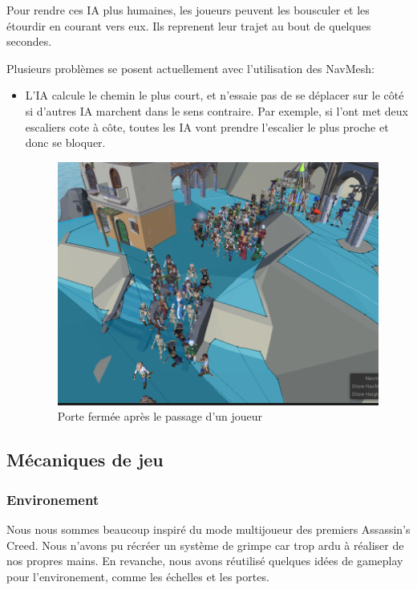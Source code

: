 \documentclass[french, 12pt]{article}
\begin{document}
    Pour rendre ces IA plus humaines, les joueurs peuvent les bousculer et les étourdir en courant vers eux.
    Ils reprenent leur trajet au bout de quelques secondes.


    Plusieurs problèmes se posent actuellement avec l'utilisation des NavMesh:
    \begin{itemize}
        \item L'IA calcule le chemin le plus court, et n'essaie pas de se déplacer sur le côté si d'autres IA marchent dans le sens contraire. Par exemple, si l'ont met deux escaliers cote à côte, toutes les IA vont prendre l'escalier le plus proche et donc se bloquer.\\
        \begin{figure}[hbt!]
            \centering
            \includegraphics[scale=0.5]{ia_stairs_bug.png}
            \caption{Porte fermée après le passage d'un joueur}
        \end{figure}
    \end{itemize}


    \subsection{Mécaniques de jeu}

        \subsubsection{Environement}
            Nous nous sommes beaucoup inspiré du mode multijoueur des premiers Assassin's Creed.
            Nous n'avons pu récréer un système de grimpe car trop ardu à réaliser de nos propres mains.
            En revanche, nous avons réutilisé quelques idées de gameplay pour l'environement, comme les échelles et les portes.\\
\end{document}
